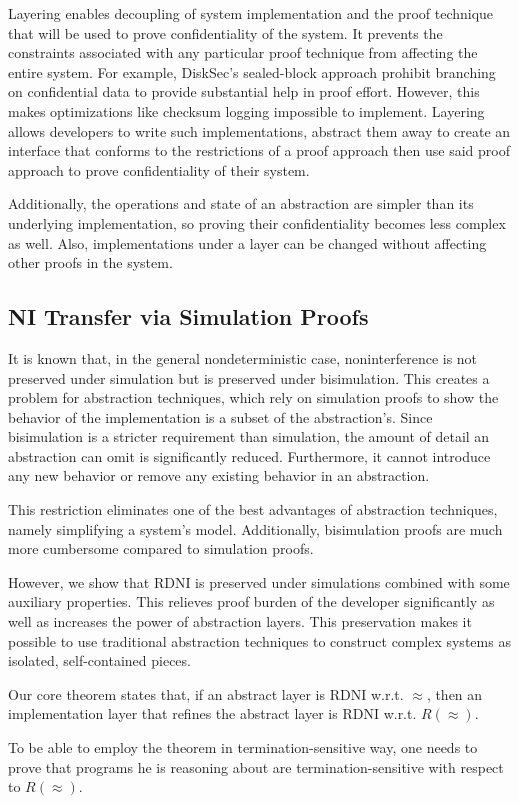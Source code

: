 Layering enables decoupling of system implementation and the proof technique that will be used to prove confidentiality of the system. It prevents the constraints associated with any particular proof technique from affecting the  entire system. For example, DiskSec's sealed-block approach prohibit branching on confidential data to provide substantial help in proof effort. However, this makes optimizations like checksum logging impossible to implement. Layering allows developers to write such implementations, abstract them away to create an interface that conforms to the restrictions of a proof approach then use said proof approach to prove confidentiality of their system.

Additionally, the operations and state of an abstraction are simpler than its underlying implementation, so proving their confidentiality becomes less complex as well. Also, implementations under a layer can be changed without affecting other proofs in the system.

\subsection{NI Transfer via Simulation Proofs}
It is known that, in the general nondeterministic case, noninterference is not preserved under simulation but is preserved under bisimulation. This creates a problem for abstraction techniques, which rely on simulation proofs to show the behavior of the implementation is a subset of the abstraction's. Since bisimulation is a stricter requirement than simulation, the amount of detail an abstraction can omit is significantly reduced. Furthermore, it cannot introduce any new behavior or remove any existing behavior in an abstraction.

This restriction eliminates one of the best advantages of abstraction techniques, namely simplifying a system's model. Additionally, bisimulation proofs are much more cumbersome compared to simulation proofs. 

However, we show that RDNI is preserved under simulations combined with some auxiliary properties. This relieves proof burden of the developer significantly as well as increases the power of abstraction layers. This preservation makes it possible to use traditional abstraction techniques to construct complex systems as isolated, self-contained pieces.

Our core theorem states that, if an abstract layer is RDNI w.r.t. $\approx$, then an implementation layer that refines the abstract layer is RDNI w.r.t. $R(\approx)$.  

To be able to employ the theorem in termination-sensitive way, one needs to prove that programs he is reasoning about are termination-sensitive with respect to $R(\approx)$.